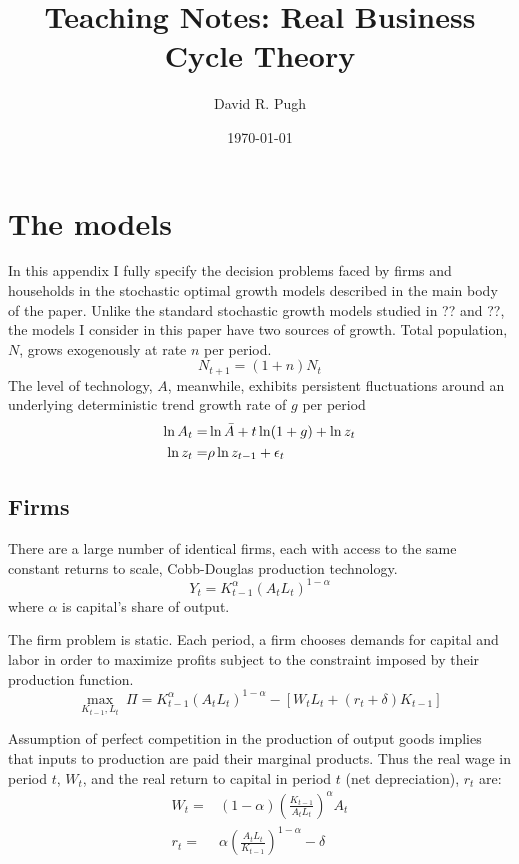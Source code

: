 \documentclass[11pt]{article}
\title{Teaching Notes: Real Business Cycle Theory}
\author{David R. Pugh}
\date{\today}                                           %
\begin{document}
\maketitle

\appendix
\section{The models}
In this appendix I fully specify the decision problems faced by firms and households in the stochastic optimal growth models described in the main body of the paper. Unlike the standard stochastic growth models studied in ?? and ??, the models I consider in this paper have two sources of growth. Total population, $N$, grows exogenously at rate $n$ per period.
	\begin{equation}\label{eq:popGrowth}
		N_{t+1} = (1 + n)N_t
	\end{equation}
The level of technology, $A$, meanwhile, exhibits persistent fluctuations around an underlying deterministic trend growth rate of $g$ per period
	\begin{align}\label{eq:techProcess}
		\ln A_{t} =& \ln\bar{A} + t\ln(1 + g) + \ln z_{t} \notag \\
		\ln z_{t} =& \rho \ln z_{t-1} + \epsilon_{t}
	\end{align}

\subsection{Firms}
There are a large number of identical firms, each with access to the same constant returns to scale, Cobb-Douglas production technology.
	\begin{equation}\label{eq:prodFunction}
		Y_{t} = K_{t-1}^{\alpha}\left(A_{t}L_{t}\right)^{1-\alpha}
	\end{equation}
where $\alpha$ is capital's share of output. 

The firm problem is static.  Each period, a firm chooses demands for capital and labor in order to maximize profits subject to the constraint imposed by their production function.
	\begin{equation}
		\max_{K_{t-1}, L_t}\ \Pi = K_{t-1}^{\alpha}\left(A_{t}L_{t}\right)^{1-\alpha} - [W_{t}L_{t} + (r_{t} + \delta)K_{t-1}]
	\end{equation}
	
Assumption of perfect competition in the production of output goods implies that inputs to production are paid their marginal products.  Thus the real wage in period $t$, $W_{t}$, and the real return to capital in period $t$ (net depreciation), $r_{t}$ are:
	\begin{align}
		W_{t} =& (1-\alpha)\left(\frac{K_{t-1}}{A_{t}L_{t}}\right)^\alpha A_{t} \label{eq:realWage} \\
		r_{t} =& \alpha\left(\frac{A_{t}L_{t}}{K_{t-1}}\right)^{1-\alpha} - \delta  \label{eq:realReturnCapital} 
	\end{align}
	
\end{document}
